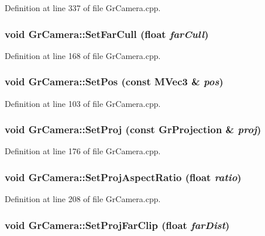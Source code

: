 Definition at line 337 of file GrCamera.cpp.\hypertarget{class_gr_camera_d131bbb579ce7b219f113831f4ba3238}{
\subsubsection[{SetFarCull}]{\setlength{\rightskip}{0pt plus 5cm}void GrCamera::SetFarCull (float {\em farCull})}}
\label{class_gr_camera_d131bbb579ce7b219f113831f4ba3238}




Definition at line 168 of file GrCamera.cpp.\hypertarget{class_gr_camera_75ce5e2e567fbce90d92d8048b33c1b4}{
\subsubsection[{SetPos}]{\setlength{\rightskip}{0pt plus 5cm}void GrCamera::SetPos (const {\bf MVec3} \& {\em pos})}}
\label{class_gr_camera_75ce5e2e567fbce90d92d8048b33c1b4}




Definition at line 103 of file GrCamera.cpp.\hypertarget{class_gr_camera_56911b628538fe22dc75e9847cc93250}{
\subsubsection[{SetProj}]{\setlength{\rightskip}{0pt plus 5cm}void GrCamera::SetProj (const {\bf GrProjection} \& {\em proj})}}
\label{class_gr_camera_56911b628538fe22dc75e9847cc93250}




Definition at line 176 of file GrCamera.cpp.\hypertarget{class_gr_camera_56203851672d7957e5d0c0638e35475f}{
\subsubsection[{SetProjAspectRatio}]{\setlength{\rightskip}{0pt plus 5cm}void GrCamera::SetProjAspectRatio (float {\em ratio})}}
\label{class_gr_camera_56203851672d7957e5d0c0638e35475f}




Definition at line 208 of file GrCamera.cpp.\hypertarget{class_gr_camera_66c885e3c1bb18de63f4d21500565600}{
\subsubsection[{SetProjFarClip}]{\setlength{\rightskip}{0pt plus 5cm}void GrCamera::SetProjFarClip (float {\em farDist})}}
\label{class_gr_camera_66c885e3c1bb18de63f4d21500565600}




